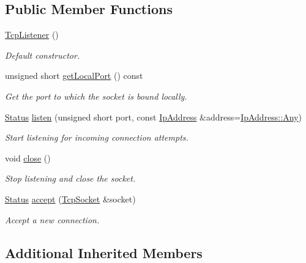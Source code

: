 \subsection*{Public Member Functions}
\begin{DoxyCompactItemize}
\item 
\mbox{\hyperlink{classsf_1_1_tcp_listener_a59a1db5b6f4711a3e57390da2f8d9630}{Tcp\+Listener}} ()
\begin{DoxyCompactList}\small\item\em Default constructor. \end{DoxyCompactList}\item 
unsigned short \mbox{\hyperlink{classsf_1_1_tcp_listener_a784b9a9c59d4cdbae1795e90b8015780}{get\+Local\+Port}} () const
\begin{DoxyCompactList}\small\item\em Get the port to which the socket is bound locally. \end{DoxyCompactList}\item 
\mbox{\hyperlink{classsf_1_1_socket_a51bf0fd51057b98a10fbb866246176dc}{Status}} \mbox{\hyperlink{classsf_1_1_tcp_listener_a9504758ea3570e62cb20b209c11776a1}{listen}} (unsigned short port, const \mbox{\hyperlink{classsf_1_1_ip_address}{Ip\+Address}} \&address=\mbox{\hyperlink{classsf_1_1_ip_address_a3dbc10b0dc6804cc69e29342f7406907}{Ip\+Address\+::\+Any}})
\begin{DoxyCompactList}\small\item\em Start listening for incoming connection attempts. \end{DoxyCompactList}\item 
void \mbox{\hyperlink{classsf_1_1_tcp_listener_a3a00a850506bd0f9f48867a0fe59556b}{close}} ()
\begin{DoxyCompactList}\small\item\em Stop listening and close the socket. \end{DoxyCompactList}\item 
\mbox{\hyperlink{classsf_1_1_socket_a51bf0fd51057b98a10fbb866246176dc}{Status}} \mbox{\hyperlink{classsf_1_1_tcp_listener_ae2c83ce5a64d50b68180c46bef0a7346}{accept}} (\mbox{\hyperlink{classsf_1_1_tcp_socket}{Tcp\+Socket}} \&socket)
\begin{DoxyCompactList}\small\item\em Accept a new connection. \end{DoxyCompactList}\end{DoxyCompactItemize}
\subsection*{Additional Inherited Members}


